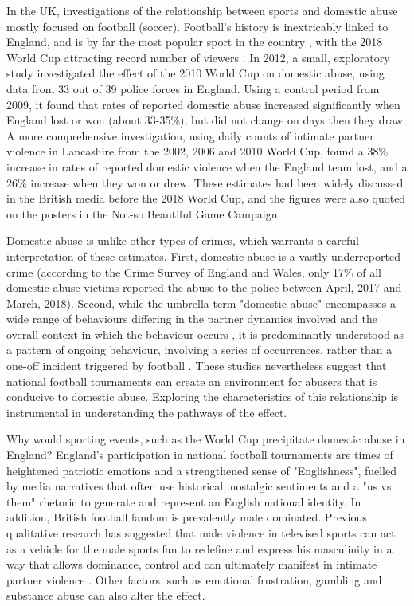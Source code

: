 \documentclass[12pt, letterpaper]{article}
\begin{document}
In the UK, investigations of the relationship between sports and domestic abuse mostly focused on football (soccer). Football's history is inextricably linked to England, and is by far the most popular sport in the country \autocite{Parry2014}, with the 2018 World Cup attracting record number of viewers \autocite{BBC}. In 2012, a small, exploratory study investigated the effect of the 2010 World Cup on domestic abuse, using data from 33 out of 39 police forces in England\autocite{Brimicombe2012}. Using a control period from 2009, it found that rates of reported domestic abuse increased significantly when England lost or won (about 33-35\%), but did not change on days then they draw. A more comprehensive investigation, using daily counts of intimate partner violence in Lancashire from the 2002, 2006 and 2010 World Cup, found a 38\% increase in rates of reported domestic violence when the England team lost, and a 26\% increase when they won or drew\autocite{Kirby2014}. These estimates had been widely discussed in the British media before the 2018 World Cup, and the figures were also quoted on the posters in the Not-so Beautiful Game Campaign.  

Domestic abuse is unlike other types of crimes, which warrants a careful interpretation of these estimates. First, domestic abuse is a vastly underreported crime (according to the Crime Survey of England and Wales, only 17\% of all domestic abuse victims reported the abuse to the police between April, 2017 and March, 2018\autocite{ONS}). Second, while the umbrella term "domestic abuse" encompasses a wide range of behaviours differing in the partner dynamics involved and the overall context in which the behaviour occurs \autocite{Kelly2008}, it is predominantly understood as a pattern of ongoing behaviour, involving a series of occurrences, rather than a one-off incident triggered by football \autocite{Brooks-Hay2018}. These studies nevertheless suggest that national football tournaments can create an environment for abusers that is conducive to domestic abuse. Exploring the characteristics of this relationship is instrumental in understanding the pathways of the effect.


Why would sporting events, such as the World Cup precipitate domestic abuse in England?   England's participation in national football tournaments are times of heightened patriotic emotions and a strengthened sense of "Englishness", fuelled by media narratives that often use historical, nostalgic sentiments and a "us vs. them" rhetoric to generate and represent an English national identity\autocite{Vincent2014}. In addition, British football fandom is prevalently male dominated\autocite{Parry2014}. Previous qualitative research has suggested that male violence in televised sports can act as a vehicle for the male sports fan to redefine and express his masculinity in a way that allows dominance, control and can ultimately manifest in intimate partner violence \autocite{Sabo}. Other factors, such as emotional frustration, gambling and substance abuse can also alter the effect.
\end{document}
